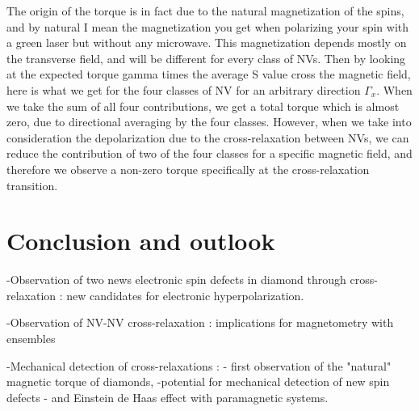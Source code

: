 \documentclass[a4paper]{article}
\begin{document}
The origin of the torque is in fact due to the natural magnetization of the spins, and by natural I mean the magnetization you get when polarizing your spin with a green laser but without any microwave. This magnetization depends mostly on the transverse field, and will be different for every class of NVs. Then by looking at the expected torque gamma times the average S value cross the magnetic field, here is what we get for the four classes of NV for an arbitrary direction $\Gamma_x$. When we take the sum of all four contributions, we get a total torque which is almost zero, due to directional averaging by the four classes. However, when we take into consideration the depolarization due to the cross-relaxation between NVs, we can reduce the contribution of two of the four classes for a specific magnetic field, and therefore we observe a non-zero torque specifically at the cross-relaxation transition.

\section{Conclusion and outlook}
-Observation of two news electronic spin defects in diamond through cross-relaxation : new candidates for electronic hyperpolarization.

-Observation of NV-NV cross-relaxation : implications for magnetometry with ensembles

-Mechanical detection of cross-relaxations : - first observation of the "natural" magnetic torque of diamonds, -potential for mechanical detection of new spin defects - and Einstein de Haas effect with paramagnetic systems.
  
\end{document}
